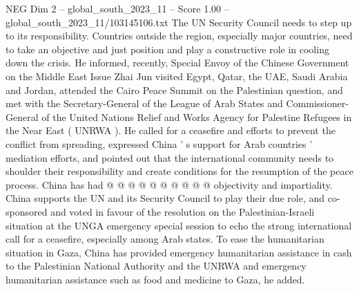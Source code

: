 \begin{textsample}{NEG Dim 2 – global\_south\_2023\_11 – Score 1.00 – global\_south\_2023\_11/103145106.txt}
The UN Security Council needs to step up to its responsibility.
Countries outside the region, especially major countries, need to take an objective and just position and play a constructive role in cooling down the crisis.
He informed, recently, Special Envoy of the Chinese Government on the Middle East Issue Zhai Jun visited Egypt, Qatar, the UAE, Saudi Arabia and Jordan, attended the Cairo Peace Summit on the Palestinian question, and met with the Secretary-General of the League of Arab States and Commissioner-General of the United Nations Relief and Works Agency for Palestine Refugees in the Near East ( UNRWA ).
He called for a ceasefire and efforts to prevent the conflict from spreading, expressed China ' s support for Arab countries ' mediation efforts, and pointed out that the international community needs to shoulder their responsibility and create conditions for the resumption of the peace process.
China has had @ @ @ @ @ @ @ @ @ @ objectivity and impartiality.
China supports the UN and its Security Council to play their due role, and co-sponsored and voted in favour of the resolution on the Palestinian-Israeli situation at the UNGA emergency special session to echo the strong international call for a ceasefire, especially among Arab states.
To ease the humanitarian situation in Gaza, China has provided emergency humanitarian assistance in cash to the Palestinian National Authority and the UNRWA and emergency humanitarian assistance such as food and medicine to Gaza, he added.

\end{textsample}
